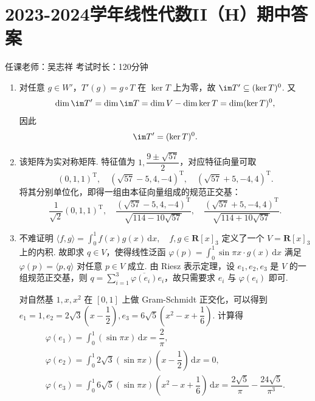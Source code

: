 \section{2023-2024学年线性代数II（H）期中答案}

\begin{center}
    任课老师：吴志祥\hspace{4em} 考试时长：120分钟
\end{center}
\begin{enumerate}
    \item 对任意 $g\in W'$，$T'(g)=g\circ T$ 在 $\ker T$ 上为零，故 $\im T'\subseteq(\ker T)^0$. 又
    \[
        \dim\im T'=\dim\im T=\dim V-\dim\ker T=\dim(\ker T)^0,
    \]
    因此
    \[
        \im T'=(\ker T)^0.
    \]

    \item 该矩阵为实对称矩阵. 特征值为 $1,\dfrac{9\pm\sqrt{57}}{2}$，对应特征向量可取
    \[
        (0,1,1)^{\mathrm{T}},\quad
        (\sqrt{57}-5, 4, -4)^{\mathrm{T}},\quad
        (\sqrt{57}+5, -4, 4)^{\mathrm{T}}.
    \]
    将其分别单位化，即得一组由本征向量组成的规范正交基：
    \[
        \frac{1}{\sqrt2}(0,1,1)^{\mathrm{T}},\quad \frac{(\sqrt{57}-5, 4, -4)^{\mathrm{T}}}
        {\sqrt{114-10\sqrt{57}}},
        \quad
        \frac{(\sqrt{57}+5, -4, 4)^{\mathrm{T}}}
        {\sqrt{114+10\sqrt{57}}}.
    \]

    \item 不难证明 $\langle f, g \rangle = \displaystyle\int_0^1 f(x)g(x)\,\mathrm{d}x, \quad f, g \in \mathbf{R}[x]_3$ 定义了一个 $V=\mathbf{R}[x]_3$ 上的内积. 故即求 $q \in V$，使得线性泛函 $\varphi(p) = \displaystyle\int_0^1 \sin\pi x \cdot g(x)\,\mathrm{d}x$ 满足 $\varphi(p) = \langle p, q \rangle$ 对任意 $p \in V$ 成立. 由 Riesz 表示定理，设 $e_1, e_2, e_3$ 是 $V$ 的一组规范正交基，则 $q = \displaystyle\sum_{i=1}^3 \overline{\varphi(e_i)} e_i$，故只需要求 $e_i$ 与 $\varphi(e_i)$ 即可.

    对自然基 $1,x, x^2$ 在 $[0,1]$ 上做 Gram-Schmidt 正交化，可以得到 $e_1=1, e_2=2\sqrt{3}(x-\dfrac{1}{2}), e_3=6\sqrt{5}(x^2-x+\dfrac{1}{6})$. 计算得
    \begin{gather*}
        \varphi(e_1) = \int_0^1 (\sin\pi x)\,\mathrm{d}x=\dfrac{2}{\pi},\\
        \varphi(e_2) = \int_0^1 2\sqrt{3}(\sin\pi x)(x-\dfrac{1}{2})\,\mathrm{d}x=0,\\
        \varphi(e_3) = \int_0^1 6\sqrt{5}(\sin\pi x)(x^2-x+\dfrac{1}{6})\,\mathrm{d}x=\dfrac{2\sqrt{5}}{\pi}-\dfrac{24\sqrt{5}}{\pi^3}.
    \end{gather*}


\end{enumerate}
